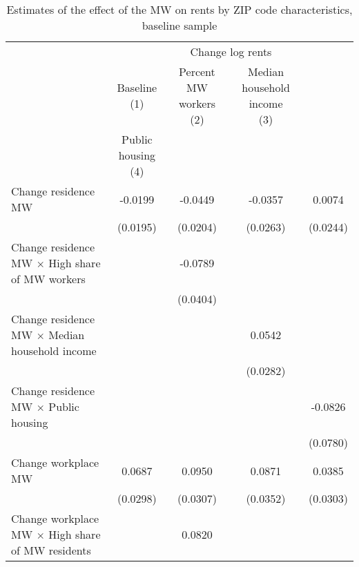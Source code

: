 \begin{table}[hbt!] \centering
    \caption{Estimates of the effect of the MW on rents by ZIP code characteristics, baseline sample}
    \label{tab:heterogeneity}
    \begin{tabular}{@{}lcccc@{}}
        \toprule
            & \multicolumn{4}{c}{Change log rents}                                                  \\ \cmidrule(l){2-5} 
            & \shortstack{Baseline\\(1)} 
            & \shortstack{Percent MW workers\\(2)}                                             
            & \shortstack{Median household income\\(3)}                                                      \\
            & \shortstack{Public housing\\(4)}                             \\ \midrule
        Change residence MW                                     &  -0.0199   &  -0.0449  &  -0.0357   &  0.0074   \\
                                                                & (0.0195)  & (0.0204) & (0.0263)  & (0.0244)  \\
        Change residence MW $\times$ High share of MW workers   &        &  -0.0789  &        &        \\
                                                                &        & (0.0404) &        &        \\
        Change residence MW $\times$ Median household income    &        &       &  0.0542   &        \\
                                                                &        &       & (0.0282)  &        \\
        Change residence MW $\times$ Public housing             &        &       &        &  -0.0826   \\
                                                                &        &       &        & (0.0780)  \\
        Change workplace MW                                     &  0.0687   &  0.0950  &  0.0871   &  0.0385   \\
                                                                & (0.0298)  & (0.0307) & (0.0352)  & (0.0303)  \\
        Change workplace MW $\times$ High share of MW residents &        &  0.0820  &        &        \\

\end{tabular}
\end{table}
